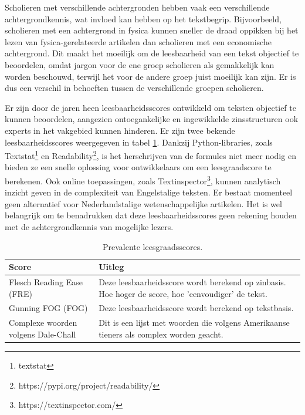 \medspace

Scholieren met verschillende achtergronden hebben vaak een verschillende achtergrondkennis, wat invloed kan hebben op het tekstbegrip. Bijvoorbeeld, scholieren met een achtergrond in fysica kunnen sneller de draad oppikken bij het lezen van fysica-gerelateerde artikelen dan scholieren met een economische achtergrond. Dit maakt het moeilijk om de leesbaarheid van een tekst objectief te beoordelen, omdat jargon voor de ene groep scholieren als gemakkelijk kan worden beschouwd, terwijl het voor de andere groep juist moeilijk kan zijn. Er is dus een verschil in behoeften tussen de verschillende groepen scholieren.

\medspace


Er zijn door de jaren heen leesbaarheidsscores ontwikkeld om teksten objectief te kunnen beoordelen, aangezien ontoegankelijke en ingewikkelde zinsstructuren ook experts in het vakgebied kunnen hinderen. Er zijn twee bekende leesbaarheidsscores weergegeven in tabel \ref{table:readability-scores}. Dankzij Python-libraries, zoals Textstat\footnote{textstat} en Readability\footnote{https://pypi.org/project/readability/}, is het herschrijven van de formules niet meer nodig en bieden ze een snelle oplossing voor ontwikkelaars om een leesgraadscore te berekenen. Ook online toepassingen, zoals Textinspector\footnote{https://textinspector.com/}, kunnen analytisch inzicht geven in de complexiteit van Engelstalige teksten. Er bestaat momenteel geen alternatief voor Nederlandstalige wetenschappelijke artikelen. Het is wel belangrijk om te benadrukken dat deze leesbaarheidsscores geen rekening houden met de achtergrondkennis van mogelijke lezers.


\begin{center}
	\begin{table}[H]
	\begin{tabular}{ | m{5cm} | m{10cm} | } 
		\hline
		\textbf{Score} & \textbf{Uitleg} \\ 
		\hline
		Flesch Reading Ease (FRE) & Deze leesbaarheidsscore wordt berekend op zinbasis. Hoe hoger de score, hoe 'eenvoudiger' de tekst. \\
		\hline
		Gunning FOG (FOG) & Deze leesbaarheidsscore wordt berekend op tekstbasis. \\
		\hline
		Complexe woorden volgens Dale-Chall & Dit is een lijst met woorden die volgens Amerikaanse tieners als complex worden geacht.
		\hline
	\end{tabular}
	\label{table:readability-scores}
	\caption{Prevalente leesgraadsscores.}
	\end{table}
\end{center}

